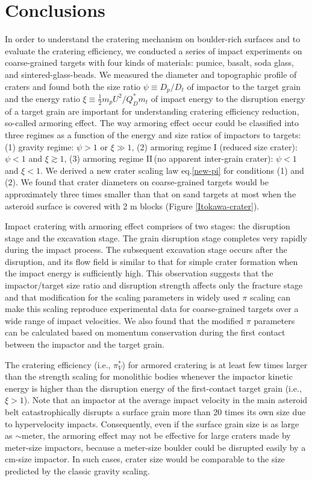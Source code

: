 \documentclass[3p,authoryear]{elsarticle}
\newcommand{\II}{I\hspace{-.1 em}I}
\begin{document}
 \section{Conclusions}\label{sec:conclusion}
In order to understand the cratering mechanism on boulder-rich surfaces and to evaluate the cratering efficiency, we conducted a series of impact experiments on coarse-grained targets with four kinds of materials: pumice, basalt, soda glass, and sintered-glass-beads.
We measured the diameter and topographic profile of craters and found both the size ratio $\psi\equiv D_p/D_t$ of impactor to the target grain and the energy ratio $\xi\equiv \frac{1}{2}m_pU^2/Q_D^*m_t$ of impact energy to the disruption energy of a target grain are important for understanding cratering efficiency reduction, so-called armoring effect.
The way armoring effect occur could be classified into three regimes as a function of the energy and size ratios of impactors to targets: (1) gravity regime: $\psi>1$ or $\xi\gg 1$, (2) armoring regime I (reduced size crater): $\psi<1$ and $\xi\gtrsim 1$, (3) armoring regime \II\,(no apparent inter-grain crater): $\psi<1$ and $\xi<1$.
We derived a new crater scaling law eq.\eqref{new-pi} for conditions (1) and (2).
We found that crater diameters on coarse-grained targets would be approximately three times smaller than that on sand targets at most when the asteroid surface is covered with 2 m blocks (Figure \ref{Itokawa-crater}).

Impact cratering with armoring effect comprises of two stages: the disruption stage and the excavation stage.
The grain disruption stage completes very rapidly during the impact process.
The subsequent excavation stage occurs after the disruption, and its flow field is similar to that for simple crater formation when the impact energy is sufficiently high.
This observation suggests that the impactor/target size ratio and disruption strength affects only the fracture stage and that modification for the scaling parameters in widely used $\pi$ scaling \citep[e.g.,][]{holsapple1993} can make this scaling reproduce experimental data for coarse-grained targets over a wide range of impact velocities.
We also found that the modified $\pi$ parameters can be calculated based on momentum conservation during the first contact between the impactor and the target grain.

The cratering efficiency (i.e., $\pi_V^*$) for armored cratering is at least few times larger than the strength scaling for monolithic bodies whenever the impactor kinetic energy is higher than the disruption energy of the first-contact target grain (i.e., $\xi>1$). Note that an impactor at the average impact velocity in the main asteroid belt catastrophically disrupts a surface grain more than 20 times its own size due to hypervelocity impacts. Consequently, even if the surface grain size is as large as $\sim$meter, the armoring effect may not be effective for large craters made by meter-size impactors, because a meter-size boulder could be disrupted easily by a cm-size impactor. In such cases, crater size would be comparable to the size predicted by the classic gravity scaling.
\end{document}
